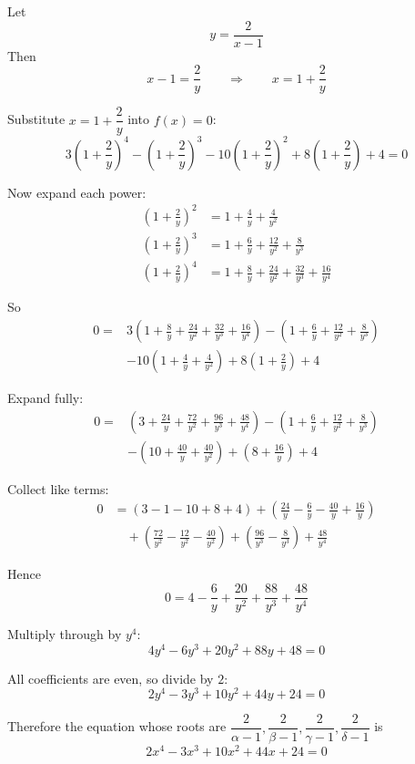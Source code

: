 \documentclass[leqno]{article}
\begin{document}
\begin{enumerate}[
  label=\textbf{\arabic*.},
  leftmargin=*,
  topsep=0pt,
  partopsep=0pt,
  parsep=0pt
]
\begin{tcolorbox}[colback=white, colframe=scarlet, title={\textbf{Solution}}, breakable, grow to left by=6mm, grow to right by=10mm]
\begin{enumerate}[label=\textbf{(\alph*)}]
Let
\[
y=\frac{2}{x-1}
\]
Then
\[
x-1=\frac{2}{y}
\qquad\Rightarrow\qquad
x=1+\frac{2}{y}
\]

Substitute \(x=1+\dfrac{2}{y}\) into \(f(x)=0\):
\[
3\left(1+\frac{2}{y}\right)^4-\left(1+\frac{2}{y}\right)^3-10\left(1+\frac{2}{y}\right)^2+8\left(1+\frac{2}{y}\right)+4=0
\]

Now expand each power:
\begin{align*}
\left(1+\frac{2}{y}\right)^2&=1+\frac{4}{y}+\frac{4}{y^2} \\
\left(1+\frac{2}{y}\right)^3&=1+\frac{6}{y}+\frac{12}{y^2}+\frac{8}{y^3} \\
\left(1+\frac{2}{y}\right)^4&=1+\frac{8}{y}+\frac{24}{y^2}+\frac{32}{y^3}+\frac{16}{y^4}
\end{align*}

So
\begin{align*}
0={}&3\left(1+\frac{8}{y}+\frac{24}{y^2}+\frac{32}{y^3}+\frac{16}{y^4}\right)
-\left(1+\frac{6}{y}+\frac{12}{y^2}+\frac{8}{y^3}\right) \\
&-10\left(1+\frac{4}{y}+\frac{4}{y^2}\right)
+8\left(1+\frac{2}{y}\right)+4
\end{align*}

Expand fully:
\begin{align*}
0={}&\left(3+\frac{24}{y}+\frac{72}{y^2}+\frac{96}{y^3}+\frac{48}{y^4}\right)
-\left(1+\frac{6}{y}+\frac{12}{y^2}+\frac{8}{y^3}\right) \\
&-\left(10+\frac{40}{y}+\frac{40}{y^2}\right)
+\left(8+\frac{16}{y}\right)+4
\end{align*}

Collect like terms:
\begin{align*}
0&=\left(3-1-10+8+4\right)
+\left(\frac{24}{y}-\frac{6}{y}-\frac{40}{y}+\frac{16}{y}\right) \\
&\quad+\left(\frac{72}{y^2}-\frac{12}{y^2}-\frac{40}{y^2}\right)
+\left(\frac{96}{y^3}-\frac{8}{y^3}\right)
+\frac{48}{y^4}
\end{align*}

Hence
\[
0=4-\frac{6}{y}+ \frac{20}{y^2}+\frac{88}{y^3}+\frac{48}{y^4}
\]

Multiply through by \(y^4\):
\[
4y^4-6y^3+20y^2+88y+48=0
\]

All coefficients are even, so divide by \(2\):
\[
2y^4-3y^3+10y^2+44y+24=0
\]

Therefore the equation whose roots are
\(\dfrac{2}{\alpha-1},\dfrac{2}{\beta-1},\dfrac{2}{\gamma-1},\dfrac{2}{\delta-1}\) is
\[
2x^4-3x^3+10x^2+44x+24=0
\]
\end{enumerate}
\end{tcolorbox}



\end{enumerate}
\end{document}
